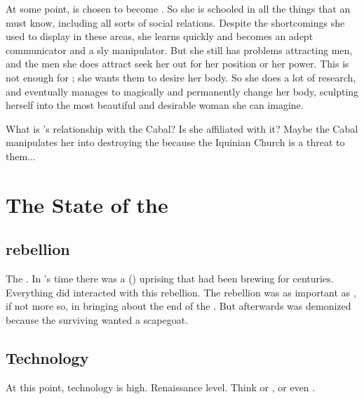 At some point, \Belzir{} is chosen to become \Calipha. So she is schooled in all the things that an \Calipha must know, including all sorts of social relations. Despite the shortcomings she used to display in these areas, she learns quickly and becomes an adept communicator and a sly manipulator. But she still has problems attracting men, and the men she does attract seek her out for her position or her power. This is not enough for \Belzir; she wants them to desire her body. So she does a lot of research, and eventually manages to magically and permanently change her body, sculpting herself into the most beautiful and desirable woman she can imagine. 

What is \Belzir's relationship with the Cabal? Is she affiliated with it? Maybe the Cabal manipulates her into destroying the \caliphate because the Iquinian Church is a threat to them... 















\section{The State of the \Caliphate}









\subsection[Scatha rebellion]{\Scatha rebellion}
The \VaimonCaliphate {}. 
In \Belzir's time there was a \scathaese (\Ortaican) uprising that had been brewing for centuries. 
Everything \Belzir did interacted with this rebellion. 
The rebellion was as important as \Belzir, if not more so, in bringing about the end of the \caliphate. 
But afterwards \Belzir was demonized because the surviving \VaimonClans wanted a scapegoat. 









\subsection{Technology}
At this point, technology is high. 
Renaissance level. 
Think  or , or even . 





